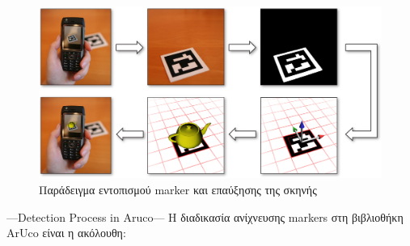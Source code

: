 \begin{figure}[H]
    \centering
    \includegraphics[scale=0.6, angle=0]{Files/Figures/HowMarkersWork.jpg}
    \caption[Παράδειγμα εντοπισμού marker και επαύξησης της σκηνής \cite{howmarkerswork}]{ Παράδειγμα εντοπισμού marker και επαύξησης της σκηνής \cite{howmarkerswork}}
    \label{fig:howmarkerswork}
\end{figure}





---Detection Process in Aruco---
Η διαδικασία ανίχνευσης markers στη βιβλιοθήκη ArUco είναι η ακόλουθη:

